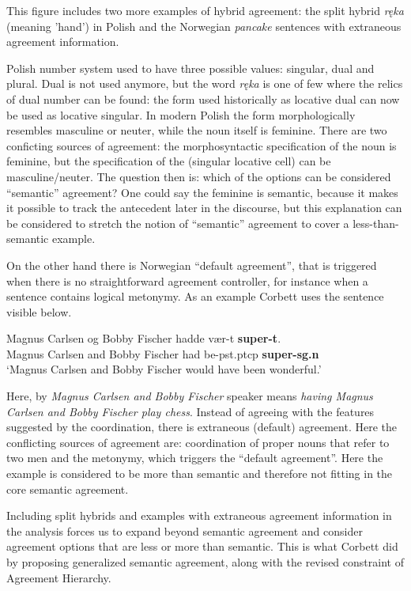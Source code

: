 This figure includes two more examples of hybrid agreement: the split hybrid \textsl{ręka} (meaning 'hand') in Polish and the Norwegian \textsl{pancake} sentences with extraneous agreement information.

Polish number system used to have three possible values: singular, dual and plural. Dual is not used anymore, but the word \textsl{ręka} is one of few where the relics of dual number can be found: the form used historically as locative dual can now be used as locative singular. In modern Polish the form morphologically resembles masculine or neuter, while the noun itself is feminine. There are two conficting sources of agreement: the morphosyntactic specification of the noun is feminine, but the specification of the (singular locative cell) can be masculine/neuter. The question then is: which of the options can be considered ``semantic'' agreement? One could say the feminine is semantic, because it makes it possible to track the antecedent later in the discourse, but this explanation can be considered to stretch the notion of ``semantic'' agreement to cover a less-than-semantic example.

On the other hand there is Norwegian ``default agreement'', that is triggered when there is no straightforward agreement controller, for instance when a sentence contains logical metonymy. As an example Corbett uses the sentence visible below.

\begin{exe}
  \ex\label{ex:norwegian-pancake}
  \gll Magnus Carlsen og Bobby Fischer hadde vær-t \textbf{super-t}.\\
  Magnus Carlsen and Bobby Fischer had be-pst.ptcp \textbf{super-sg.n}\\
  \glt ‘Magnus Carlsen and Bobby Fischer would have been wonderful.’
\end{exe}

Here, by \textsl{Magnus Carlsen and Bobby Fischer} speaker means \textsl{having Magnus Carlsen and Bobby Fischer play chess}. Instead of agreeing with the features suggested by the coordination, there is extraneous (default) agreement. Here the conflicting sources of agreement are: coordination of proper nouns that refer to two men and the metonymy, which triggers the ``default agreement''. Here the example is considered to be more than semantic and therefore not fitting in the core semantic agreement.

Including split hybrids and examples with extraneous agreement information in the analysis forces us to expand beyond semantic agreement and consider agreement options that are less or more than semantic. This is what Corbett did by proposing generalized semantic agreement, along with the revised constraint of Agreement Hierarchy.

